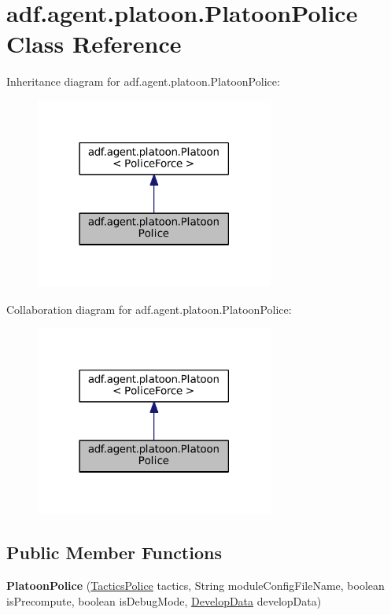 \hypertarget{classadf_1_1agent_1_1platoon_1_1PlatoonPolice}{}\section{adf.\+agent.\+platoon.\+Platoon\+Police Class Reference}
\label{classadf_1_1agent_1_1platoon_1_1PlatoonPolice}


Inheritance diagram for adf.\+agent.\+platoon.\+Platoon\+Police\+:
\nopagebreak
\begin{figure}[H]
\begin{center}
\leavevmode
\includegraphics[width=222pt]{classadf_1_1agent_1_1platoon_1_1PlatoonPolice__inherit__graph}
\end{center}
\end{figure}


Collaboration diagram for adf.\+agent.\+platoon.\+Platoon\+Police\+:
\nopagebreak
\begin{figure}[H]
\begin{center}
\leavevmode
\includegraphics[width=222pt]{classadf_1_1agent_1_1platoon_1_1PlatoonPolice__coll__graph}
\end{center}
\end{figure}
\subsection*{Public Member Functions}
\begin{DoxyCompactItemize}
\item 
\hypertarget{classadf_1_1agent_1_1platoon_1_1PlatoonPolice_a8f0ad2cab2c2274ecba2496d1b813e63}{}\label{classadf_1_1agent_1_1platoon_1_1PlatoonPolice_a8f0ad2cab2c2274ecba2496d1b813e63} 
{\bfseries Platoon\+Police} (\hyperlink{classadf_1_1component_1_1tactics_1_1TacticsPolice}{Tactics\+Police} tactics, String module\+Config\+File\+Name, boolean is\+Precompute, boolean is\+Debug\+Mode, \hyperlink{classadf_1_1agent_1_1develop_1_1DevelopData}{Develop\+Data} develop\+Data)
\end{DoxyCompactItemize}
